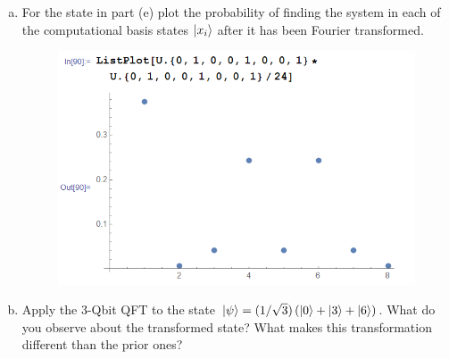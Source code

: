\documentclass{book}
\theoremstyle{definition}
\newcommand{\lp}{\left(}
\newcommand{\rp}{\right)}
\begin{document}
\begin{enumerate}[(a)]
	
	\newpage
	
	\item  For the state in part (e) plot the probability of finding the system in each of
	the computational basis states $\ket{x_i}$ after it has been Fourier transformed.
	\begin{figure}[!htb]
		\centering
		\includegraphics[scale=0.5]{period}
	\end{figure}
	
	
	
	\newpage
	
	
	\item Apply the 3-Qbit QFT to the state $\ket{\psi} = (1/\sqrt{3})\lp \ket{0} + \ket{3} + \ket{6} \rp$. What do you observe about the transformed state? What makes this transformation
	different than the prior ones?


\end{enumerate}
\end{document}
